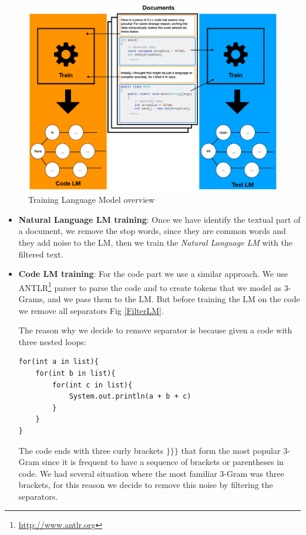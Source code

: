 \documentclass[12pt,mscthesis]{usiinfthesis}
\begin{document}
	\begin{figure}[H]
	\centering
	\includegraphics[width=\textwidth]{trainingLm}
	\caption{Training Language Model overview}
	\label{trainingLm}
	\end{figure}


	\begin{itemize}
		\item \textbf{Natural Language LM training}: Once we have identify the textual part of a document, we remove the stop words, since they are common words and they add noise to the LM, then we train the \emph{Natural Language LM} with the filtered text.
		\item \textbf{Code LM training}: For the code part we use a similar approach. We use ANTLR\footnote{\url{http://www.antlr.org}} parser to parse the code and to create tokens that we model as 3-Grams, and we pass them to the LM. But before training the LM on the code we remove all separators Fig \ref{FilterLM}.


		The reason why we decide to remove separator is because given a code with three nested loops:	

		\begin{lstlisting}
for(int a in list){
	for(int b in list){
		for(int c in list){
			System.out.println(a + b + c)
		}
	}
}

		\end{lstlisting}

		The code ends with three curly brackets $\textbf{\}\}\}}$ that form the most popular 3-Gram since it is frequent to have a sequence of brackets or parentheses in code. We had several situation where the most familiar 3-Gram was three brackets, for this reason we decide to remove this noise by filtering the separators.

	\end{itemize}
	
\end{document}
